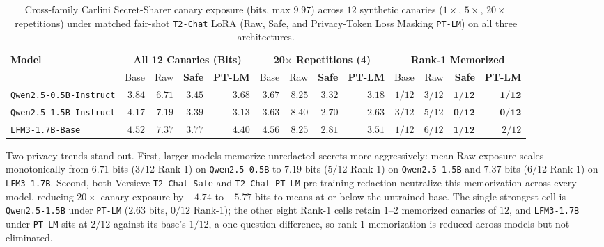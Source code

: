 \documentclass{article}
\begin{document}
\begin{table}[t]
\caption{Cross-family Carlini Secret-Sharer canary exposure (bits, max $9.97$) across $12$ synthetic canaries ($1\times$, $5\times$, $20\times$ repetitions) under matched fair-shot \texttt{T2-Chat} LoRA (Raw, Safe, and Privacy-Token Loss Masking \texttt{PT-LM}) on all three architectures.}
\label{tab:canary}
\vskip 0.08in
\begin{center}
\footnotesize
\setlength{\tabcolsep}{3.8pt}
\begin{tabular}{lrrrrrrrrrrrr}
\toprule
\textbf{Model} & \multicolumn{4}{c}{\textbf{All 12 Canaries (Bits)}} & \multicolumn{4}{c}{\textbf{20$\times$ Repetitions (4)}} & \multicolumn{4}{c}{\textbf{Rank-1 Memorized}} \\
\cmidrule(lr){2-5}\cmidrule(lr){6-9}\cmidrule(lr){10-13}
 & Base & Raw & \textbf{Safe} & \textbf{PT-LM} & Base & Raw & \textbf{Safe} & \textbf{PT-LM} & Base & Raw & \textbf{Safe} & \textbf{PT-LM} \\
\midrule
\texttt{Qwen2.5-0.5B-Instruct} & $3.84$ & $6.71$ & $\mathbf{3.45}$ & $3.68$ & $3.67$ & $8.25$ & $3.32$ & $\mathbf{3.18}$ & $1/12$ & $3/12$ & $\mathbf{1/12}$ & $\mathbf{1/12}$ \\
\texttt{Qwen2.5-1.5B-Instruct} & $4.17$ & $7.19$ & $3.39$ & $\mathbf{3.13}$ & $3.63$ & $8.40$ & $2.70$ & $\mathbf{2.63}$ & $3/12$ & $5/12$ & $\mathbf{0/12}$ & $\mathbf{0/12}$ \\
\texttt{LFM3-1.7B-Base} & $4.52$ & $7.37$ & $\mathbf{3.77}$ & $4.40$ & $4.56$ & $8.25$ & $\mathbf{2.81}$ & $3.51$ & $1/12$ & $6/12$ & $\mathbf{1/12}$ & $2/12$ \\
\bottomrule
\end{tabular}
\end{center}
\vskip -0.14in
\end{table}

Two privacy trends stand out. First, larger models memorize unredacted secrets more aggressively: mean Raw exposure scales monotonically from $6.71$ bits ($3/12$ Rank-1) on \texttt{Qwen2.5-0.5B} to $7.19$ bits ($5/12$ Rank-1) on \texttt{Qwen2.5-1.5B} and $7.37$ bits ($6/12$ Rank-1) on \texttt{LFM3-1.7B}. Second, both Versieve \texttt{T2-Chat Safe} and \texttt{T2-Chat PT-LM} pre-training redaction neutralize this memorization across every model, reducing $20\times$-canary exposure by $-4.74$ to $-5.77$ bits to means at or below the untrained base. The single strongest cell is \texttt{Qwen2.5-1.5B} under \texttt{PT-LM} ($2.63$ bits, $0/12$ Rank-1); the other eight Rank-1 cells retain $1$--$2$ memorized canaries of $12$, and \texttt{LFM3-1.7B} under \texttt{PT-LM} sits at $2/12$ against its base's $1/12$, a one-question difference, so rank-1 memorization is reduced across models but not eliminated.
\end{document}
